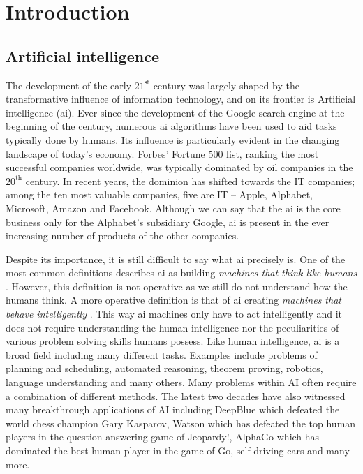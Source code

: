 \chapter{Introduction}\label{ch:introduction}


\section{Artificial intelligence}


The development of the early $21^{\text{st}}$ century was largely shaped by the transformative influence of information technology, and on its frontier is  Artificial intelligence (\gls{ai}).
Ever since the development of the Google search engine at the beginning of the century, numerous \gls{ai} algorithms have been used to aid tasks typically done by humans.
Its influence is particularly evident in the changing landscape of today's economy.
Forbes' Fortune 500 list, ranking the most successful companies worldwide, was typically dominated by oil companies in the $20^{\text{th}}$ century.
In recent years, the dominion has shifted towards the IT companies; among the ten most valuable companies, five are IT -- Apple, Alphabet, Microsoft, Amazon and Facebook.
Although we can say that the \gls{ai} is the core business only for the Alphabet's subsidiary Google, \gls{ai} is present in the ever increasing number of products of the other companies.







Despite its importance, it is still difficult to say what \gls{ai} precisely is.
One of the most common definitions describes \gls{ai} as building \textit{machines that think like humans} \cite{Russell:2009:AIM:1671238}.
However, this definition is not operative as we still do not understand how the humans think.
A more operative definition is that of \gls{ai} creating \textit{machines that behave intelligently} \cite{Turing:1995:CMI:216408.216410}.
This  way \gls{ai} machines only have to act intelligently and it does not require understanding the human intelligence nor the peculiarities of various problem solving skills humans possess.
Like human intelligence, \gls{ai} is a broad field including many different tasks.
Examples include problems of planning and scheduling, automated reasoning, theorem proving, robotics, language understanding and many others.
Many problems within AI often require a combination of different methods.
The latest two decades have also witnessed many breakthrough applications of AI including DeepBlue \cite{Hsu:2002:BDB:601291}  which defeated the world chess champion Gary Kasparov, Watson \cite{journals/aim/FerrucciBCFGKLMNPSW10} which has defeated the top human players in the question-answering game of Jeopardy!, AlphaGo \cite{SilverHuangEtAl16nature,silver2017mastering} which has dominated the best human player in the game of Go, self-driving cars and many more.





